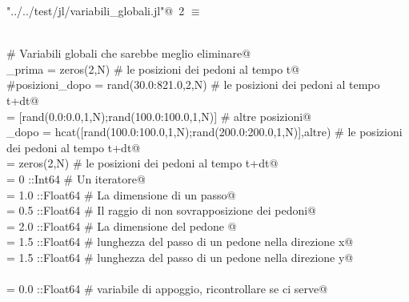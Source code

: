 \documentclass[]{article}
\begin{document}
\begin{flushleft} \small
\begin{minipage}{\linewidth} \label{scrap2}
\protect{}\verb@"../../test/jl/variabili_globali.jl"@\nobreak\ {\footnotesize 2 }$\equiv$
\vspace{-1ex}
\begin{list}{}{} \item
\mbox{}\verb@@\\
\mbox{}\verb@# Variabili globali che sarebbe meglio eliminare@\\
\mbox{}\verb@posizioni_prima = zeros(2,N)           # le posizioni dei pedoni al tempo t@\\
\mbox{}\verb@#posizioni_dopo = rand(30.0:821.0,2,N)    # le posizioni dei pedoni al tempo t+dt@\\
\mbox{}\verb@altre = [rand(0.0:0.0,1,N);rand(100.0:100.0,1,N)] # altre posizioni@\\
\mbox{}\verb@posizioni_dopo = hcat([rand(100.0:100.0,1,N);rand(200.0:200.0,1,N)],altre) # le posizioni dei pedoni al tempo t+dt@\\
\mbox{}\verb@velocita = zeros(2,N)                  # le posizioni dei pedoni al tempo t+dt@\\
\mbox{}\verb@k = 0 ::Int64                       # Un iteratore@\\
\mbox{}\verb@passo = 1.0 ::Float64                  # La dimensione di un passo@\\
\mbox{}\verb@raggio = 0.5 ::Float64                 # Il raggio di non sovrapposizione dei pedoni@\\
\mbox{}\verb@dimenpedone = 2.0 ::Float64                  # La dimensione del pedone @\\
\mbox{}\verb@scalax = 1.5 ::Float64                 # lunghezza del passo di un pedone nella direzione x@\\
\mbox{}\verb@scalay = 1.5 ::Float64                 # lunghezza del passo di un pedone nella direzione y@\\
\mbox{}\verb@@\\
\mbox{}\verb@mmm = 0.0 ::Float64                    # variabile di appoggio, ricontrollare se ci serve@\\
\mbox{}\verb@@{\NWsep}
\end{list}
\vspace{-2ex}
\end{minipage}\\[4ex]
\end{flushleft}
\end{document}
